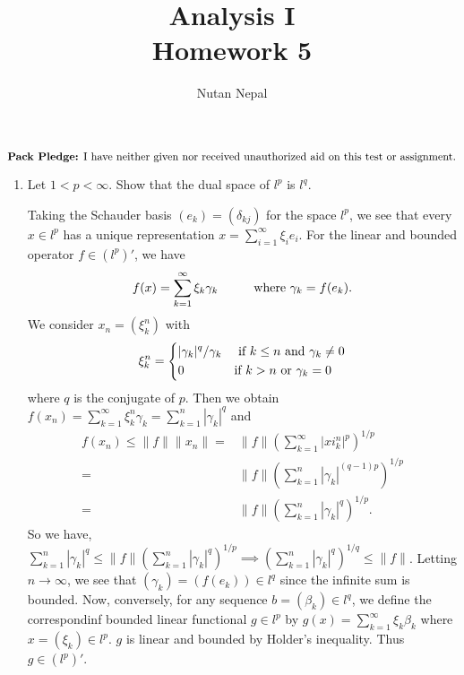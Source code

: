 \documentclass[12pt]{article}
\title{Analysis I \\
\large Homework 5
}
\author{Nutan Nepal}
\newcommand{\packpledge}{
    $\text{{\bf Pack Pledge:} I have neither given nor
    received unauthorized aid on this
    test or assignment.}$}
\begin{document}
\maketitle
\packpledge\\
\makebox[\linewidth]{\rule{200mm}{1pt}}
\vspace{1mm}

\begin{enumerate}

\item Let $1 < p < \infty$.
Show that the dual space of $l^p$ is $l^q$. 

\begin{mybox}

    Taking the Schauder basis $(e_k)=(\delta_{kj})$ for
    the space $l^p$, we see that every $x\in l^p$ has a
    unique representation $x=\sum_{i=1}^\infty{\xi_i e_i}$.
    For the linear and bounded operator $f\in (l^p)'$, we
    have
    $$f(x)=\sum_{k=1}^\infty{\xi_k \gamma_k}\hspace*{10mm}
    \text{where }\gamma_k=f(e_k).$$
    We consider $x_n=(\xi_k^n)$ with
    $$\xi_k^n=\begin{dcases}
        |\gamma_k|^q/\gamma_k &\text{ if }k\leq n
        \text{ and } \gamma_k\neq 0\\
        0 &\text{if } k>n \text{ or } \gamma_k=0
    \end{dcases}$$
    where $q$ is the conjugate of $p$. Then we obtain
    $f(x_n)=\sum_{k=1}^\infty{\xi_k^n\gamma_k}=
    \sum_{k=1}^n{|\gamma_k|^q}$ and
    \begin{align*}
        f(x_n)\leq \|f\|\|x_n\|=&\|f\|\left(\sum_{k=1}
        ^\infty{|xi_k^n}|^p\right)^{1/p}\\
        =&\|f\|\left(\sum_{k=1}^n{|\gamma_k|^{(q-1)p
        }}\right)^{1/p}\\
        =&\|f\|\left(\sum_{k=1}^n{|\gamma_k|^q}\right)
        ^{1/p}.
    \end{align*}
    So we have, $\sum_{k=1}^n{|\gamma_k|^q}\leq
    \|f\|\left(\sum_{k=1}^n{|\gamma_k|^q}\right)^{1/p}
    \implies \left(\sum_{k=1}^n{|\gamma_k|^q}\right)^{1/q}
    \leq\|f\|$. Letting $n\longrightarrow \infty$, we see
    that $(\gamma_k)=(f(e_k))\in l^q$ since the infinite
    sum is bounded. Now, conversely, for any sequence
    $b=(\beta_k)\in l^q$, we define the correspondinf
    bounded linear functional $g\in l^p$ by $g(x)
    =\sum_{k=1}^\infty{\xi_k\beta_k}$ where $x=(\xi_k)
    \in l^p$. $g$ is linear and bounded by Holder's
    inequality. Thus $g\in (l^p)'$.


\end{mybox}
\end{enumerate}
\end{document}
